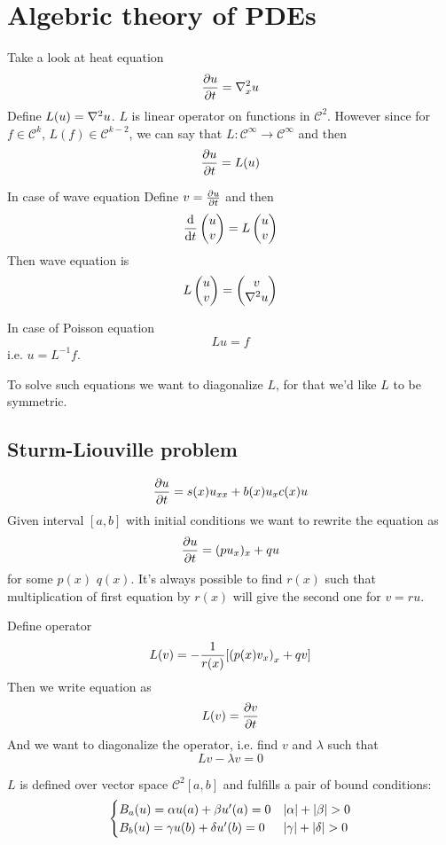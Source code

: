 \section{Algebric theory of PDEs}
Take a look at heat equation
$$\pdv{u}{t} = \laplacian_x u$$
Define $L(u) = \laplacian u$. $L$ is linear operator on functions in $\mathcal{C}^2$. However since for $f\in \mathcal{C}^k$, $L(f) \in \mathcal{C}^{k-2}$, we can say that $L: \mathcal{C}^\infty \to \mathcal{C}^\infty$ and then
$$\pdv{u}{t}  =L(u)$$

In case of wave equation
Define $v=\pdv{u}{t}$ and then
$$\dv{t} \begin{pmatrix}u\\v\end{pmatrix} = L \begin{pmatrix}u\\v\end{pmatrix}$$
Then wave equation is
$$ L \begin{pmatrix}u\\v\end{pmatrix}=  \begin{pmatrix}v\\\laplacian{u}\end{pmatrix} $$

In case of Poisson equation
$$Lu = f$$
i.e.
$u=L^{-1}f$.

To solve such equations we want to diagonalize $L$, for that we'd like $L$ to be symmetric.
\subsection{Sturm-Liouville problem }
$$\pdv{u}{t} = s(x) u_{xx} + b(x) u_x c(x) u$$
Given interval $[a,b]$ with initial conditions we want to rewrite the equation as
$$\pdv{u}{t} = (pu_x)_x + qu$$
for some $p(x)$ $q(x)$. It's always possible to find  $r(x)$ such that multiplication of first equation by $r(x)$ will give the second one for $v=ru$. 

Define operator
$$L(v) = -\frac{1}{r(x)}[\qty(p(x) v_x)_x + qv]$$
Then we write equation as
$$L(v) = \pdv{v}{t}$$
And we want to diagonalize the operator, i.e. find $v$ and $\lambda$ such that
$$Lv - \lambda v = 0$$

$L$ is defined over vector space $\mathcal{C}^2[a,b]$ and fulfills a pair of bound conditions:
$$\begin{cases}
B_a(u) = \alpha u(a) + \beta u'(a) = 0& \abs{\alpha} + \abs{\beta}>0\\
B_b(u)  = \gamma u(b) + \delta u'(b) = 0& \abs{\gamma} + \abs{\delta}>0
\end{cases}$$

